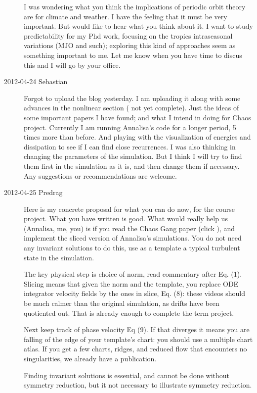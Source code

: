 \begin{description}
I was wondering what you think the implications of periodic orbit theory are for climate and weather. I have the feeling that it must be very important. But would like to hear what you think about it. I want to study predictability for my Phd work, focusing on the tropics intraseasonal variations (MJO and such); exploring this kind of approaches seem as something important to me. Let me know when you have time to discus this and I will go by your office.

\item[2012-04-24 Sebastian]
Forgot to upload the blog yesterday. I am uploading it along with some advances in the nonlinear section ( not yet complete). Just the ideas of some important papers I have found; and what I intend in doing for Chaos project.
Currently I am running Annalisa's code for a longer period, 5 times more than before. And playing with the visualization of energies and dissipation to see if I can find close recurrences. I was also thinking in changing the parameters of the simulation. But I think I will try to find them first in the simulation as it is, and then change them if necessary.
Any suggestions or recommendations are welcome.

\item[2012-04-25 Predrag]
Here is my concrete proposal for what you can do now, for the course
project. What you have written is good. What would really help us
(Annalisa, me, you) is if you read the Chaos Gang paper (click
),
and implement the sliced version of Annalisa's simulations. You do not
need any invariant solutions to do this, use as a template a typical
turbulent state in the simulation.

The key physical step is choice of norm, read commentary after Eq. (1).
Slicing means that given the norm and the template, you replace ODE
integrator velocity fields by the ones in slice, Eq. (8): these videos
should be much calmer than the original simulation, as drifts have been
quotiented out. That is already enough to complete the term project.


Next keep track of phase velocity Eq (9). If that diverges it means you
are falling of the edge of your template's chart: you should use a
multiple chart atlas. If you get a few charts, ridges, and reduced flow that
encounters no singularities, we already have a publication.

Finding invariant solutions is essential, and cannot be done without
symmetry reduction, but it not necessary to illustrate symmetry
reduction.


\end{description}

